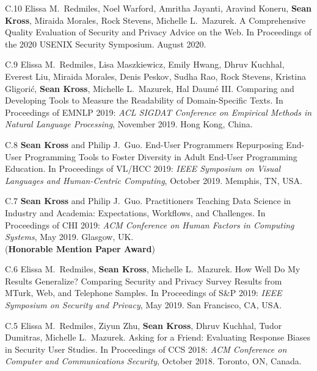 \begin{bibenum}

\item[C.10] Elissa M.\ Redmiles, Noel Warford, Amritha Jayanti, Aravind Koneru,
\textbf{Sean Kross}, Miraida Morales, Rock Stevens, Michelle L.\ Mazurek.
A Comprehensive Quality Evaluation of Security and Privacy Advice on the Web. 
In Proceedings of the 2020 USENIX Security Symposium. August 2020.

\item[C.9] Elissa M.\ Redmiles, Lisa Maszkiewicz, Emily Hwang, Dhruv Kuchhal,
Everest Liu, Miraida Morales, Denis Peskov, Sudha Rao, Rock Stevens, 
Kristina Gligorić, \textbf{Sean Kross}, Michelle L.\ Mazurek, Hal Daumé III.
Comparing and Developing Tools to Measure the Readability of Domain-Specific 
Texts. In Proceedings of EMNLP 2019: \emph{ACL SIGDAT Conference on Empirical 
Methods in Natural Language Processing}, November 2019. Hong Kong, China.

\item[C.8] \textbf{Sean Kross} and Philip J.\ Guo. End-User Programmers 
Repurposing End-User Programming Tools to Foster Diversity in Adult End-User 
Programming Education. In Proceedings of VL/HCC 2019: \emph{IEEE
Symposium on Visual Languages and Human-Centric Computing}, October 2019. 
Memphis, TN, USA.


\item[C.7] \textbf{Sean Kross} and Philip J.\ Guo. Practitioners Teaching Data 
Science in Industry and Academia: Expectations, Workflows, and Challenges.
In Proceedings of CHI 2019: \emph{ACM Conference on Human Factors in Computing 
Systems}, May 2019. Glasgow, UK. \\ ({\textbf{Honorable Mention Paper Award}})

\item[C.6] Elissa M.\ Redmiles, \textbf{Sean Kross}, Michelle L.\ Mazurek. 
How Well Do My Results Generalize? Comparing Security and Privacy Survey Results
from MTurk, Web, and Telephone Samples. In Proceedings of S\&P 2019: 
\emph{IEEE Symposium on Security and Privacy}, May 2019. San Francisco, CA, USA.

\item[C.5] Elissa M.\ Redmiles, Ziyun Zhu, \textbf{Sean Kross}, Dhruv Kuchhal,
Tudor Dumitras, Michelle L.\ Mazurek. Asking for a Friend: Evaluating Response 
Biases in Security User Studies. In Proceedings of CCS 2018: \emph{ACM 
Conference on Computer and Communications Security}, October 2018. Toronto, ON, 
Canada.


\end{bibenum}
